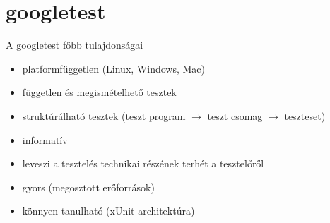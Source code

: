 \documentclass[usenames,dvipsnames,aspectratio=169]{beamer}
\newcommand{\hiv}[1]{{\color{hivatkozasszin}#1}}
\begin{document}
% 
% 

\section{googletest}

\begin{frame}
  A googletest főbb tulajdonságai
  \begin{itemize}
    \item platformfüggetlen (Linux, Windows, Mac)
    \item független és megismételhető tesztek
    \item struktúrálható tesztek (teszt program $\to$ teszt csomag $\to$ teszteset)
    \item informatív
    \item leveszi a tesztelés technikai részének terhét a tesztelőről
    \item gyors (megosztott erőforrások)
    \item könnyen tanulható (xUnit architektúra)
  \end{itemize}
\end{frame}
\end{document}
